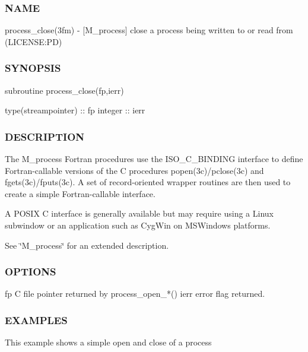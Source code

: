 \subsubsection*{N\+A\+ME}

process\+\_\+close(3fm) -\/ \mbox{[}M\+\_\+process\mbox{]} close a process being written to or read from (L\+I\+C\+E\+N\+SE\+:PD) 

\subsubsection*{S\+Y\+N\+O\+P\+S\+IS}

\begin{DoxyVerb} subroutine process_close(fp,ierr)

   type(streampointer) :: fp
   integer             :: ierr
\end{DoxyVerb}


\subsubsection*{D\+E\+S\+C\+R\+I\+P\+T\+I\+ON}

The M\+\_\+process Fortran procedures use the I\+S\+O\+\_\+\+C\+\_\+\+B\+I\+N\+D\+I\+NG interface to define Fortran-\/callable versions of the C procedures popen(3c)/pclose(3c) and fgets(3c)/fputs(3c). A set of record-\/oriented wrapper routines are then used to create a simple Fortran-\/callable interface.

A P\+O\+S\+IX C interface is generally available but may require using a Linux subwindow or an application such as Cyg\+Win on M\+S\+Windows platforms.

See \char`\"{}\+M\+\_\+process\char`\"{} for an extended description.

\subsubsection*{O\+P\+T\+I\+O\+NS}

\begin{DoxyVerb}fp       C file pointer returned by process_open_*()
ierr     error flag returned.
\end{DoxyVerb}


\subsubsection*{E\+X\+A\+M\+P\+L\+ES}

This example shows a simple open and close of a process

